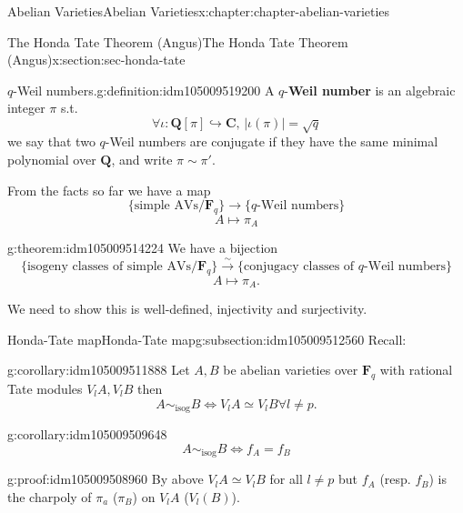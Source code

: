 \documentclass[oneside,10pt,]{book}
\newcommand{\terminology}[1]{\textbf{#1}}
\numberwithin{equation}{section}
\newcommand{\lb}{[}
\newcommand{\rb}{]}
\newcommand{\QQ}{\mathbf{Q}}
\newcommand{\CC}{\mathbf{C}}
\newcommand{\FF}{\mathbf{F}}
\begin{document}
\begin{chapterptx}{Abelian Varieties}{}{Abelian Varieties}{}{}{x:chapter:chapter-abelian-varieties}
\begin{sectionptx}{The Honda Tate Theorem (Angus)}{}{The Honda Tate Theorem (Angus)}{}{}{x:section:sec-honda-tate}
\begin{introduction}{}
\begin{definition}{\(q\)-Weil numbers.}{g:definition:idm105009519200}
A \(q\)-\terminology{Weil number} is an algebraic integer \(\pi\) s.t.%
\begin{equation*}
\forall \iota \colon \QQ\lb \pi\rb \hookrightarrow \CC,\,|\iota(\pi)| = \sqrt q
\end{equation*}
we say that two \(q\)-Weil numbers are conjugate if they have the same minimal polynomial over \(\QQ\), and write \(\pi \sim \pi'\).%
\end{definition}
From the facts so far we have a map%
\begin{equation*}
\{\text{simple AVs}/\FF_q\}\to \{q\text{-Weil numbers}\}
\end{equation*}
%
\begin{equation*}
A \mapsto \pi_A
\end{equation*}
%
\begin{theorem}{}{}{g:theorem:idm105009514224}%
We have a bijection%
\begin{equation*}
\{\text{isogeny classes of simple AVs}/\FF_q\}\xrightarrow{\sim} \{\text{conjugacy classes of }q\text{-Weil numbers}\}
\end{equation*}
%
\begin{equation*}
A \mapsto \pi_A\text{.}
\end{equation*}
%
\end{theorem}
We need to show this is well-defined, injectivity and surjectivity.%
\end{introduction}%
%
%
\typeout{************************************************}
\typeout{************************************************}
%
\begin{subsectionptx}{Honda-Tate map}{}{Honda-Tate map}{}{}{g:subsection:idm105009512560}
Recall:%
\begin{corollary}{}{}{g:corollary:idm105009511888}%
Let \(A,B\) be abelian varieties over \(\FF_q\) with rational Tate modules \(V_l A, V_lB\) then%
\begin{equation*}
A\sim_{\text{isog}} B \iff V_l A \simeq V_l B \forall l \ne p\text{.}
\end{equation*}
%
\end{corollary}
\begin{corollary}{}{}{g:corollary:idm105009509648}%
%
\begin{equation*}
A\sim_{\text{isog}} B \iff f_A = f_B
\end{equation*}
%
\end{corollary}
\begin{proofptx}{}{g:proof:idm105009508960}
By above \(V_l A \simeq V_lB\) for all \(l \ne p\) but \(f_A\) (resp. \(f_B\)) is the charpoly of \(\pi_a\) (\(\pi_B\)) on \(V_l A\) (\(V_l(B)\)).%

\end{proofptx}
\end{subsectionptx}
\end{sectionptx}
\end{chapterptx}
\end{document}
